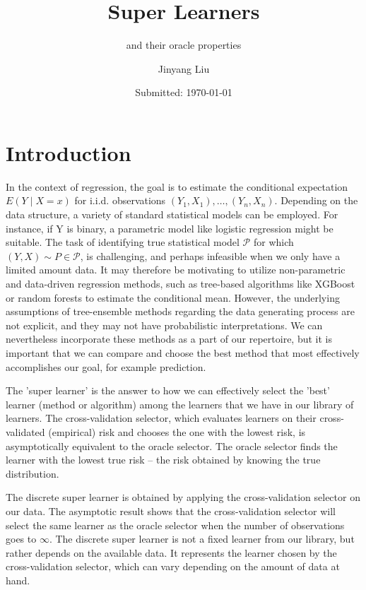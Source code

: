 \documentclass[11pt, a4paper]{article}
\author{Jinyang Liu}
\title{Super Learners}
\subtitle{and their oracle properties}
\date{Submitted: \today}
\theoremstyle{definition}
\theoremstyle{remark}
\begin{document}
\begingroup
    \selectfont
    \maketitle
    \tableofcontents
    \newpage
\endgroup


\section{Introduction}
In the context of regression, the goal is to estimate the conditional expectation $ E(Y \mid X = x) $ for i.i.d. observations $ (Y_1 , X_1) , \dots , (Y_n , X_n) $. Depending on the data structure, a variety of standard statistical models can be employed. For instance, if Y is binary, a parametric model like logistic regression might be suitable.
The task of identifying true statistical model $ \mathcal{P} $ for which $ (Y, X) \sim P \in \mathcal{P} $, is challenging, and perhaps infeasible when we only have a limited amount data. It may therefore be motivating to utilize non-parametric and data-driven regression methods, such as tree-based algorithms like XGBoost or random forests to estimate the conditional mean. However, the underlying assumptions of tree-ensemble methods regarding the data generating process are not explicit, and they may not have probabilistic interpretations. We can nevertheless incorporate these methods as a part of our repertoire, but it is important that we can compare and choose the best method that most effectively accomplishes our goal, for example prediction. 

The 'super learner' is the answer to how we can effectively select the 'best' learner (method or algorithm) among the learners that we have in our library of learners. The cross-validation selector, which evaluates learners on their cross-validated (empirical) risk and chooses the one with the lowest risk, is asymptotically equivalent to the oracle selector. The oracle selector finds the learner with the lowest true risk -- the risk obtained by knowing the true distribution. 

The discrete super learner is obtained by applying the cross-validation selector on our data. The asymptotic result shows that the cross-validation selector will select the same learner as the oracle selector when the number of observations goes to $ \infty $. The discrete super learner is not a fixed learner from our library, but rather depends on the available data. It represents the learner chosen by the cross-validation selector, which can vary depending on the amount of data at hand.
\end{document}
